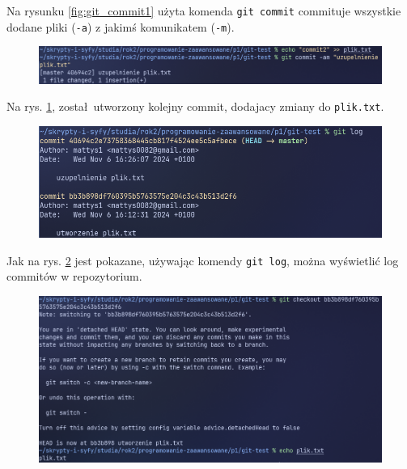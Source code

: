 Na rysunku \ref{fig:git_commit1} użyta komenda \texttt{git commit} commituje wszystkie dodane pliki (\texttt{-a}) z jakimś komunikatem (\texttt{-m}).  

\begin{figure}[H]
	\centering
	\includegraphics[width=1\textwidth]{images/git_commit2.png}
	\caption{}
	\label{fig:git_commit2}
\end{figure}

Na rys. \ref{fig:git_commit2}, został utworzony kolejny commit, dodajacy zmiany do \texttt{plik.txt}.

\begin{figure}[H]
	\centering
	\includegraphics[width=1\textwidth]{images/git_log.png}
	\caption{}
	\label{fig:git_log}
\end{figure}

Jak na rys. \ref{fig:git_log} jest pokazane, używając komendy \texttt{git log}, można wyświetlić log commitów w repozytorium.

\begin{figure}[H]
	\centering
	\includegraphics[width=1\textwidth]{images/git_checkout.png}
	\caption{}
	\label{fig:git_checkout}
\end{figure}

